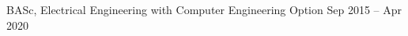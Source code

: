 \begin{cventries}
\begin{cventrymulti}
    \cvposition
      {
        BASc,
        Electrical Engineering with Computer Engineering
        Option
      } %
      {Sep 2015 -- Apr 2020} %
      {
      } %
  \end{cventrymulti}
  \vspace{-1.5em}

\end{cventries}
